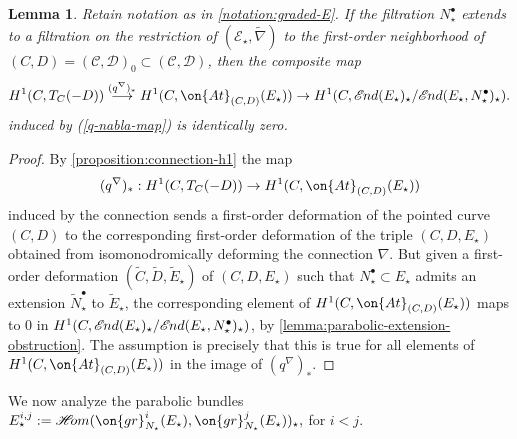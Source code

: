 \documentclass[12 pt]{amsart}
\theoremstyle{plain}
\newtheorem{lemma}[subsubsection]{Lemma}
\theoremstyle{definition}
\theoremstyle{remark}
\numberwithin{equation}{section}
\newcommand*{\sheafhom}{\mathscr{H}\kern -2pt om}
\newcommand*{\sheafend}{\mathscr{E}\kern -1pt nd}
\begin{document}
\begin{lemma}
	\label{lemma:h1-map}
	Retain notation as in \autoref{notation:graded-E}.
If the filtration $N_\star^\bullet$ extends to a filtration on the restriction of
$(\mathscr E_\star,\widetilde{\nabla})$ to the first-order neighborhood of $(C,D)=(\mathscr{C}, \mathscr{D})_0\subset (\mathscr{C}, \mathscr{D})$, 
then the composite map
\begin{align*}
	H^1(C,T_C(-D))
\overset{(q^\nabla)_*}\longrightarrow H^1(C, \on{At}_{(C,D)}(E_\star))
\to H^1(C, \sheafend(E_\star)_\star/\sheafend(E_\star, N^\bullet_\star)_\star).
\end{align*}
induced by (\ref{q-nabla-map}) is identically zero.
\end{lemma}
\begin{proof}
By \autoref{proposition:connection-h1}
the map $$(q^\nabla)_*: H^1(C,T_C(-D))\to
H^1(C, \on{At}_{(C,D)}(E_\star))$$
induced by the connection
sends a first-order deformation of the pointed curve $(C,D)$
to the corresponding first-order deformation of the triple $(C,D,E_\star)$
obtained from isomonodromically deforming the connection $\nabla$.
But given a first-order deformation $(\widetilde{C}, \widetilde{D} ,
\widetilde{E}_\star)$
of $(C, D, E_\star)$
such that $N_\star^\bullet \subset E_\star$ admits an extension $\widetilde N_\star^\bullet$ to
$\widetilde E_\star$, 
the corresponding element of
$H^1(C, \on{At}_{(C,D)}(E_\star))$ maps to $0$ in $H^1(C,
\sheafend(E_\star)_\star/\sheafend(E_\star, N^\bullet_\star)_\star)$, 
by \autoref{lemma:parabolic-extension-obstruction}. The assumption is precisely that this is true for all elements of $H^1(C, \on{At}_{(C,D)}(E_\star))$ in the image of $(q^\nabla)_*$.
\end{proof}

We now analyze the parabolic bundles $E_\star^{i,j}:=\sheafhom(\on{gr}^i_{N_\star}(E_\star),
\on{gr}^j_{N_\star}(E_\star))_\star,$ for $i<j.$
\end{document}
